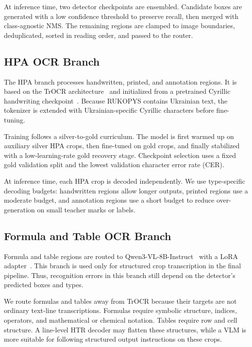 \documentclass[runningheads]{llncs}
\begin{document}
At inference time, two detector checkpoints are ensembled. Candidate boxes are generated with a low confidence threshold to preserve recall, then merged with class-agnostic NMS. The remaining regions are clamped to image boundaries, deduplicated, sorted in reading order, and passed to the router.

\subsection{HPA OCR Branch}
\label{sec:hpa}

The HPA branch processes handwritten, printed, and annotation regions. It is based on the TrOCR architecture~\cite{li2023trocr} and initialized from a pretrained Cyrillic handwriting checkpoint~\cite{cyrillic_htr_model_2025}. Because RUKOPYS contains Ukrainian text, the tokenizer is extended with Ukrainian-specific Cyrillic characters before fine-tuning.

Training follows a silver-to-gold curriculum. The model is first warmed up on auxiliary silver HPA crops, then fine-tuned on gold crops, and finally stabilized with a low-learning-rate gold recovery stage. Checkpoint selection uses a fixed gold validation split and the lowest validation character error rate (CER).

At inference time, each HPA crop is decoded independently. We use type-specific decoding budgets: handwritten regions allow longer outputs, printed regions use a moderate budget, and annotation regions use a short budget to reduce over-generation on small teacher marks or labels.

\subsection{Formula and Table OCR Branch}
\label{sec:qwen}

Formula and table regions are routed to Qwen3-VL-8B-Instruct~\cite{qwen3vltechnicalreport} with a LoRA adapter~\cite{hu2022lora}. This branch is used only for structured crop transcription in the final pipeline. Thus, recognition errors in this branch still depend on the detector's predicted boxes and types.

We route formulas and tables away from TrOCR because their targets are not ordinary text-line transcriptions. Formulas require symbolic structure, indices, operators, and mathematical or chemical notation. Tables require row and cell structure. A line-level HTR decoder may flatten these structures, while a VLM is more suitable for following structured output instructions on these crops.
\end{document}
